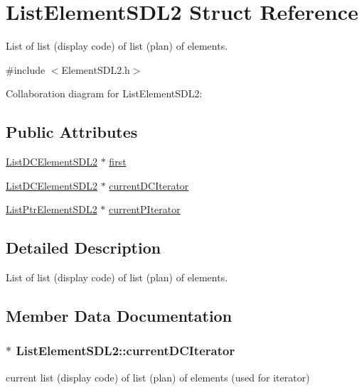 \hypertarget{structListElementSDL2}{}\section{List\+Element\+S\+D\+L2 Struct Reference}
\label{structListElementSDL2}


List of list (display code) of list (plan) of elements.  




{\ttfamily \#include $<$Element\+S\+D\+L2.\+h$>$}



Collaboration diagram for List\+Element\+S\+D\+L2\+:
\subsection*{Public Attributes}
\begin{DoxyCompactItemize}
\item 
\hyperlink{structListDCElementSDL2}{List\+D\+C\+Element\+S\+D\+L2} $\ast$ \hyperlink{structListElementSDL2_a7f871d1b4f017fc8c778c49a3583eecb}{first}
\item 
\hyperlink{structListDCElementSDL2}{List\+D\+C\+Element\+S\+D\+L2} $\ast$ \hyperlink{structListElementSDL2_aa2c7b7135bd405aeed7860875569c7dd}{current\+D\+C\+Iterator}
\item 
\hyperlink{structListPtrElementSDL2}{List\+Ptr\+Element\+S\+D\+L2} $\ast$ \hyperlink{structListElementSDL2_a3bb9a3656cbff63c06e54554f93b2f87}{current\+P\+Iterator}
\end{DoxyCompactItemize}


\subsection{Detailed Description}
List of list (display code) of list (plan) of elements. 

\subsection{Member Data Documentation}
\subsubsection[{\texorpdfstring{current\+D\+C\+Iterator}{currentDCIterator}}]{$\ast$ List\+Element\+S\+D\+L2\+::current\+D\+C\+Iterator}\hypertarget{structListElementSDL2_aa2c7b7135bd405aeed7860875569c7dd}{}\label{structListElementSDL2_aa2c7b7135bd405aeed7860875569c7dd}
current list (display code) of list (plan) of elements (used for iterator) 

